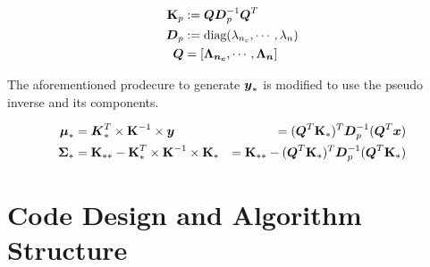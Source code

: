 \documentclass{article}
\begin{document}
\begin{align*}
    \boldsymbol{\mathrm{K}}_p &:= \boldsymbol{Q} \boldsymbol{D}_p^{-1} \boldsymbol{Q}^{T} \\
    \boldsymbol{D}_p &:= \text{diag}(\lambda_{n_c}, \cdots, \lambda_{n}) \\  
    \boldsymbol{Q} &= \left[\boldsymbol{\Lambda_{n_c}}, \cdots, \boldsymbol{\Lambda_{n}}\right]   
   \end{align*}
\emp

The aforementioned prodecure to generate $\boldsymbol{y}_*$ is modified to use the pseudo inverse and its components. 

\begin{align*}
    \boldsymbol{\mu}_*  &=  \boldsymbol{K}_*^T \times \boldsymbol{\mathrm{K}}^{-1} \times \boldsymbol{y}  
                &= (\boldsymbol{Q}^T\boldsymbol{\mathrm{K}}_*)^T\boldsymbol{D}_p^{-1}(\boldsymbol{Q}^T\boldsymbol{x}) \\
    \boldsymbol{\Sigma}_* &= \boldsymbol{\mathrm{K}}_{**} - \boldsymbol{\mathrm{K}}_*^T \times \boldsymbol{\mathrm{K}}^{-1} \times \boldsymbol{\mathrm{K}}_* 
                   &= \boldsymbol{\mathrm{K}}_{**} - (\boldsymbol{Q}^T\boldsymbol{\mathrm{K}}_*)^T\boldsymbol{D}_p^{-1}(\boldsymbol{Q}^T\boldsymbol{\mathrm{K}}_*) 
\end{align*}
\emp




\section{Code Design and Algorithm Structure}
\end{document}
